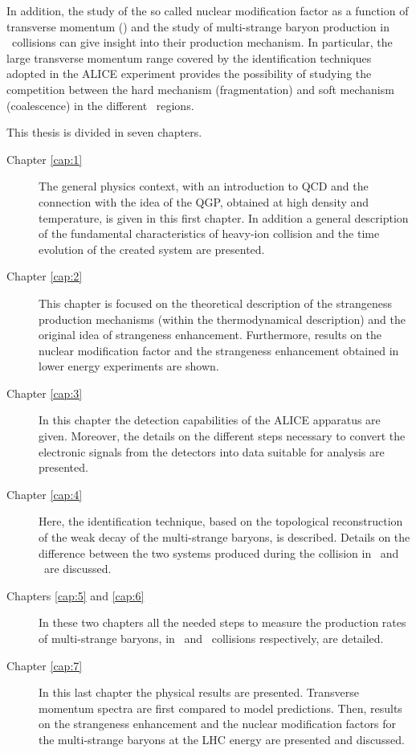 In addition, the study of the so called nuclear modification factor as a function of transverse momentum (\pt) and the study of multi-strange baryon production in \pp\ collisions can give insight into their production mechanism. In particular, the large transverse momentum range covered by the identification techniques adopted in the ALICE experiment provides the possibility of studying the competition between the hard mechanism (fragmentation) and soft mechanism (coalescence) in the different \pt\ regions.

This thesis is divided in seven chapters. 

\begin{description}
\item[Chapter \ref{cap:1}] The general physics context,  with an introduction to QCD and the connection with the idea of the QGP, obtained at high density and temperature, is given in this first chapter. In addition a general description of the fundamental characteristics of heavy-ion collision and the time evolution of the created system are presented. 
\item[Chapter \ref{cap:2}] This chapter is focused on the theoretical description of the strangeness production mechanisms (within the thermodynamical description) and the original idea of strangeness enhancement. Furthermore, results on the nuclear modification factor and the strangeness enhancement obtained in lower energy experiments are shown.
\item[Chapter \ref{cap:3}] In this chapter the detection capabilities of the ALICE apparatus are given. Moreover, the details on the different steps necessary to convert the electronic signals from the detectors into data suitable for analysis are presented.
\item[Chapter \ref{cap:4}] Here, the identification technique, based on the topological reconstruction of the weak decay of the multi-strange baryons, is described. Details on the difference between the two systems produced during the collision in \PbPb\ and \pp\ are discussed.
\item[Chapters \ref{cap:5} and \ref{cap:6}] In these two chapters all the needed steps to measure the production rates of multi-strange baryons, in \PbPb\ and \pp\ collisions respectively, are detailed.
\item[Chapter \ref{cap:7}] In this last chapter the physical results are presented. Transverse momentum spectra are first compared to model predictions. Then, results on the strangeness enhancement and the nuclear modification factors for the multi-strange baryons at the LHC energy are presented and discussed.
\end{description}



        